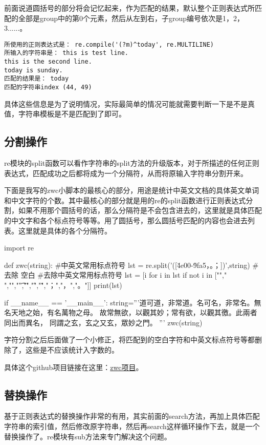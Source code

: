 \documentclass[12pt,oneside]{book}
\begin{document}
\begin{common-format}
前面说道圆括号的部分将会记忆起来，作为匹配的结果，默认整个正则表达式所匹配的全部是group中的第0个元素，然后从左到右，子group编号依次是1，2，3......。

\begin{Verbatim}
所使用的正则表达式是： re.compile('(?m)^today', re.MULTILINE)
所输入的字符串是： this is test line.
this is the second line.
today is sunday.
匹配的结果是： today
匹配的字符串index (44, 49)
\end{Verbatim}

具体这些信息是为了说明情况，实际最简单的情况可能就需要判断一下是不是真值，字符串模板是不是匹配到了即可。


\subsection{分割操作}
re模块的split函数可以看作字符串的split方法的升级版本，对于所描述的任何正则表达式，匹配成功之后都将成为一个分隔符，从而将原输入字符串分割开来。

下面是我写的zwc小脚本的最核心的部分，用途是统计中英文文档的具体英文单词和中文字符的个数。其中最核心的部分就是用的re的split函数进行正则表达式分割，如果不用那个圆括号的话，那么分隔符是不会包含进去的，这里就是具体匹配的中文字和各个标点符号等等。用了圆括号，那么圆括号匹配的内容也会进去列表。这里就是具体的各个分隔符。

\begin{tcbpython}[]
import re

def zwc(string):
    #中英文常用标点符号
    lst = re.split('([\u4e00-\u9fa5\s，。；])',string)
    #去除 空白
    #去除\s 中英文常用标点符号
    lst = [i for i in lst if not  i in
    [""," ","\n","\t","\r","\f","\v","；","，","。"]]
    print(lst)

if __name__ == '__main__':
    string='''道可道，非常道。名可名，非常名。無名天地之始，有名萬物之母。
    故常無欲，以觀其妙；常有欲，以觀其徼。此兩者同出而異名，
    同謂之玄，玄之又玄，眾妙之門。 '''
    zwc(string)
\end{tcbpython}

字符分割之后后面做了一个小修正，将匹配到的空白字符和中英文标点符号等都删除了，这些是不应该统计入字数的。

具体这个github项目链接在这里：\href{https://github.com/a358003542/zwc}{zwc项目}。


\subsection{替换操作}
基于正则表达式的替换操作非常的有用，其实前面的search方法，再加上具体匹配字符串的索引值，然后修改原字符串，然后再search这样循环操作下去，就是一个替换操作了。re模块有sub方法来专门解决这个问题。


\end{common-format}
\end{document}
